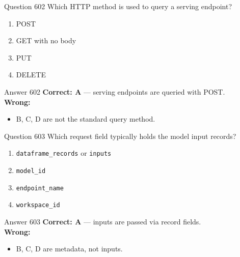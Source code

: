 \documentclass[aspectratio=169,11pt]{beamer}
\begin{document}
	\begin{frame}{Question 602}
		Which HTTP method is used to query a serving endpoint?
		\begin{enumerate}[label=\Alph*.]
			\item POST
			\item GET with no body
			\item PUT
			\item DELETE
		\end{enumerate}
	\end{frame}
	\begin{frame}{Answer 602}
		\textbf{Correct: A} --- serving endpoints are queried with POST.\\
		\vspace{0.5em}
		\textbf{Wrong:}
		\begin{itemize}
			\item B, C, D are not the standard query method.
		\end{itemize}
	\end{frame}
	
	\begin{frame}{Question 603}
		Which request field typically holds the model input records?
		\begin{enumerate}[label=\Alph*.]
			\item \texttt{dataframe\_records} or \texttt{inputs}
			\item \texttt{model\_id}
			\item \texttt{endpoint\_name}
			\item \texttt{workspace\_id}
		\end{enumerate}
	\end{frame}
	\begin{frame}{Answer 603}
		\textbf{Correct: A} --- inputs are passed via record fields.\\
		\vspace{0.5em}
		\textbf{Wrong:}
		\begin{itemize}
			\item B, C, D are metadata, not inputs.
		\end{itemize}
	\end{frame}
	
\end{document}
